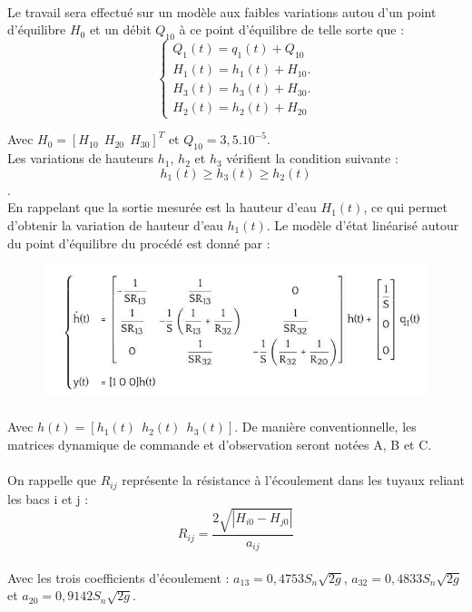\paragraph{} Le travail sera effectué sur un modèle aux faibles variations autou d'un point d'équilibre $H_0$ et un débit $Q_{10}$ à ce point d'équilibre de telle sorte que :\\

\begin{equation*}
\left\lbrace
\begin{array}{ccc}
Q_1(t) = q_1(t)+Q_{10} \\
H_1(t) = h_1(t)+H_{10}. \\
H_3(t) = h_3(t)+H_{30}. \\
H_2(t) = h_2(t)+H_{20}
\end{array}\right.
\end{equation*}
 
Avec $H_0 = [H_{10}~~H_{20}~~H_{30}]^T$ et $Q_{10}=3,5.10^{-5}$.\\

Les variations de hauteurs $h_1$, $h_2$ et $h_3$  vérifient la condition suivante :
$$h_1(t) \ge h_3(t) \ge h_2(t)$$.\\

En rappelant que la sortie mesurée est la hauteur d'eau $H_1(t)$, ce qui permet d'obtenir la variation de hauteur d'eau $h_1(t)$. Le modèle d'état linéarisé autour du point d'équilibre du procédé est donné par :

\begin{figure}
\centering
\includegraphics[scale = 0.5]{modele_detat_linearise.jpg}
\label{fig12}
\end{figure}

\paragraph{} Avec $h(t)=[h_1(t)~~h_2(t)~~h_3(t)]$. De manière conventionnelle, les matrices dynamique de commande et d'observation seront notées A, B et C. 
\paragraph{} On rappelle que $R_{ij}$ représente la résistance à l'écoulement dans les tuyaux reliant les bacs i et j :\large
$$R_{ij}=\frac{2\sqrt{|H_{i0}-H_{j0}|}}{a_{ij}}$$\normalsize
\paragraph{} Avec les trois coefficients d'écoulement : $a_{13}=0,4753S_n\sqrt{2g}$, $a_{32}=0,4833S_n\sqrt{2g}$ et $a_{20}=0,9142S_n\sqrt{2g}$.

